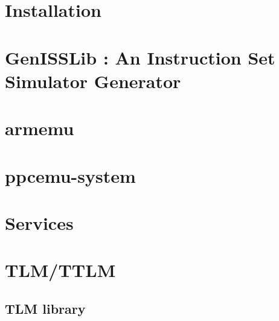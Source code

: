 \documentclass[a4paper,11pt,onecolumn]{mathese}
\begin{document}
\setlength{\parskip}{0.5em}%
\baselineskip 14pt

%


\frontmatter
%
%

\tableofcontents {}
\listoffigures

\mainmatter

\chapter{Installation}
\label{installation}


\chapter{GenISSLib : An Instruction Set Simulator Generator}
\label{genisslib}


\chapter{armemu}
\label{armemu}


\chapter{ppcemu-system}
\label{ppcemu_system}


\chapter{Services}
\label{services}


\chapter{TLM/TTLM}
\label{tlm_ttlm}


\begin{appendix}
\chapter{TLM library}
\label{tlm_appendix}


\end{appendix}

% 
%  

%
%
\end{document}
